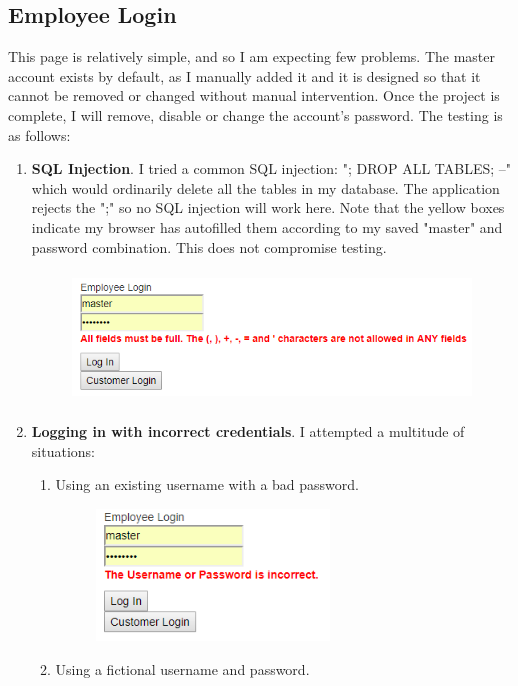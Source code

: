 ﻿\documentclass{article}
\begin{document}
    \subsection{Employee Login}
    This page is relatively simple, and so I am expecting few problems.
    The master account exists by default, as I manually added it and it is designed so that it cannot be removed or changed without manual intervention.
    Once the project is complete, I will remove, disable or change the account's password.
    The testing is as follows:
    \begin{enumerate}
        \item \textbf{SQL Injection}.
        I tried a common SQL injection: "; DROP ALL TABLES; --" which would ordinarily delete all the tables in my database.
        The application rejects the ";" so no SQL injection will work here.
        Note that the yellow boxes indicate my browser has autofilled them according to my saved "master" and password combination.
        This does not compromise testing.
        \begin{figure}[H]
            \includegraphics[height=3.5cm]{testing/empLogin1.png}
            \centering
        \end{figure}
        \item \textbf{Logging in with incorrect credentials}.
        I attempted a multitude of situations:
        \begin{enumerate}
            \item Using an existing username with a bad password.
            \begin{figure}[H]
                \includegraphics[height=3.5cm]{testing/empLogin2.png}
                \centering
            \end{figure}
            \item Using a fictional username and password.

\end{enumerate}
\end{enumerate}
\end{document}
